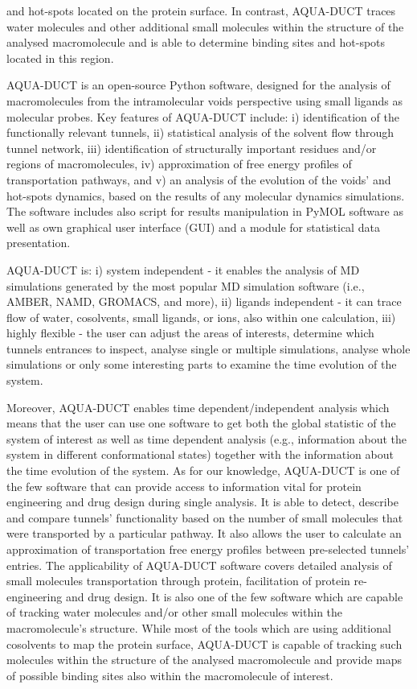 \documentclass[9pt,tutorial, pubversion]{livecoms}
\begin{document}
and hot-spots located on the protein surface. In contrast, AQUA-DUCT traces water molecules and other additional small molecules within the structure of the analysed macromolecule and is able to determine binding sites and hot-spots located in this region. 

AQUA-DUCT is an open-source Python software, designed for the analysis of macromolecules from the intramolecular voids perspective using small ligands as molecular probes. Key features of AQUA-DUCT include: i) identification of the functionally relevant tunnels, ii) statistical analysis of the solvent flow through tunnel network, iii) identification of structurally important residues and/or regions of macromolecules, iv) approximation of free energy profiles of transportation pathways, and v) an analysis of the evolution of the voids’ and hot-spots dynamics, based on the results of any molecular dynamics simulations. The software includes also script for results manipulation in PyMOL \cite{Delano2002} software as well as own graphical user interface (GUI) and a module for statistical data presentation. 

AQUA-DUCT is:
\newline
i) system independent - it enables the analysis of MD simulations generated by the most popular MD simulation software (i.e., AMBER, NAMD, GROMACS, and more), 
\newline
ii) ligands independent - it can trace flow of water, cosolvents, small ligands, or ions, also within one calculation, 
\newline
iii) highly flexible - the user can adjust the areas of interests, determine which tunnels entrances to inspect, analyse single or multiple simulations, analyse whole simulations or only some interesting parts to examine the time evolution of the system. 

Moreover, AQUA-DUCT enables time dependent/independent analysis which means that the user can use one software to get both the global statistic of the system of interest as well as time dependent analysis (e.g., information about the system in different conformational states) together with the information about the time evolution of the system. As for our knowledge, AQUA-DUCT is one of the few software that can provide access to information vital for protein engineering and drug design during single analysis. It is able to detect, describe and compare tunnels' functionality based on the number of small molecules that were transported by a particular pathway. It also allows the user to calculate an approximation of transportation free energy profiles between pre-selected tunnels’ entries. The applicability of AQUA-DUCT software covers detailed analysis of small molecules transportation through protein, facilitation of protein re-engineering and drug design. It is also one of the few software which are capable of tracking water molecules and/or other small molecules within the macromolecule's structure. While most of the tools which are using additional cosolvents to map the protein surface, AQUA-DUCT is capable of tracking such molecules within the structure of the analysed macromolecule and provide maps of possible binding sites also within the macromolecule of interest. 
\end{document}

